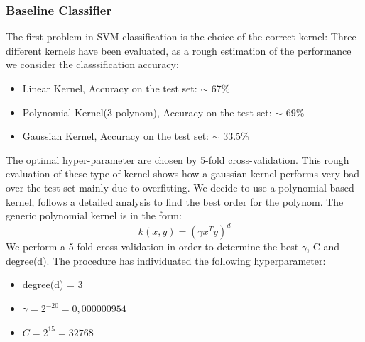 \documentclass[a4paper,10pt]{article}
\begin{document}
    \subsubsection{Baseline Classifier}
      The first problem in SVM classification is the choice of the correct kernel:\newline
      Three different kernels have been evaluated, as a rough estimation of the performance we consider the classsification accuracy:
      \begin{itemize}
       \item Linear Kernel, Accuracy on the test set: $\sim$ 67\%
       \item Polynomial Kernel(3\textdegree \hspace{.1mm} polynom), Accuracy on the test set: $\sim$ 69\% 
       \item Gaussian Kernel, Accuracy on the test set: $\sim$ 33.5\%
      \end{itemize}
      The optimal hyper-parameter are chosen by 5-fold cross-validation.\newline
      This rough evaluation of these type of kernel shows how a gaussian kernel performs very bad over the test set mainly due to overfitting.\newline
      We decide to use a polynomial based kernel, follows a detailed analysis to find the best order for the polynom.\newline
      The generic polynomial kernel is in the form:
      \begin{equation}
       k(x,y) = (\gamma x^Ty)^d
      \end{equation}
      We perform a 5-fold cross-validation in order to determine the best $\gamma$, C and degree(d).\newline
      The procedure has individuated the following hyperparameter:
      \begin{itemize}
       \item degree(d) = 3
       \item $\gamma = 2^{-20} = 0,000000954$
       \item $C = 2^{15} = 32768$
      \end{itemize}
\end{document}
